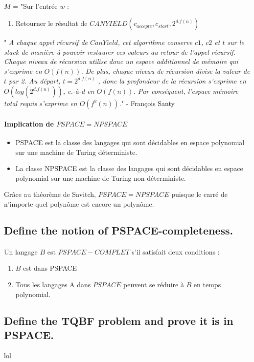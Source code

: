 \paragraph{}
$M$ = "Sur l'entrée $w$ :
\begin{enumerate}
\item Retourner le résultat de $CANYIELD(c_{accepte}, c_{start}, 2^{d.f(n)})$
\end{enumerate}
"\textit{
A chaque appel récursif de $CanYield$, cet algorithme conserve $c1$, $c2$ et $t$ sur le stack de manière à pouvoir restaurer ces valeurs au retour de l’appel récursif. Chaque niveau de récursion utilise donc un espace additionnel de mémoire qui s’exprime en $O(f(n))$. De plus, chaque niveau de récursion divise la valeur de $t$ par 2. Au départ, $t = 2^{d.f(n)}$ , donc la profondeur de la récursion s’exprime en $O(log (2^{d.f(n)}))$, c.-à-d en $O(f(n))$. Par conséquent, l’espace mémoire total requis s’exprime en $O(f^{2}(n))$.}" - François Santy
\paragraph{Implication de $PSPACE = NPSPACE$}
\begin{itemize}
\item PSPACE est la classe des langages qui sont décidables en espace polynomial sur une machine de Turing déterministe.
\item La classe NPSPACE est la classe des langages qui sont décidables en espace polynomial sur une machine de Turing non déterministe.
\end{itemize}
Grâce au théorème de Savitch, $PSPACE = NPSPACE$ puisque le carré de n’importe quel polynôme est encore un polynôme.
\subsection{Define the notion of PSPACE-completeness.}
\paragraph{}
Un langage $B$ est $PSPACE-COMPLET$ s'il satisfait deux conditions :
\begin{enumerate}
  \item $B$ est dans PSPACE
  \item Tous les langages A dans $PSPACE$ peuvent se réduire à $B$ en temps polynomial.
\end{enumerate}

\subsection{Define the TQBF problem and prove it is in PSPACE.}
lol

